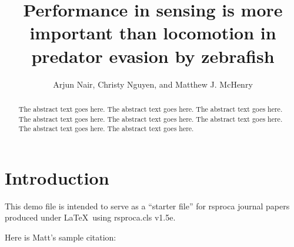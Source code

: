 \documentclass[]{rsos}%
\begin{document}
\title{Performance in sensing is more important than locomotion in predator evasion by zebrafish}

\author{%
Arjun Nair, Christy Nguyen, and Matthew J. McHenry}

\address{Department of Ecology and Evolutionary Biology\\
University of California, Irvine\\
321 Steinhaus Hall\\
Irvine, CA 92697}

\subject{Locomotion, strategy, sensing}



\begin{abstract}
The abstract text goes here. The abstract text goes here. The abstract text goes here. The abstract text goes here.
The abstract text goes here. The abstract text goes here. The abstract text goes here. The abstract text goes here.
\end{abstract}


\maketitle





\section{Introduction}

This demo file is intended to serve as a ``starter file''
for rsproca journal papers produced under \LaTeX\ using
rsproca.cls v1.5e.


Here is Matt's sample citation: \cite{Alexander:1974ba}
\end{document}
